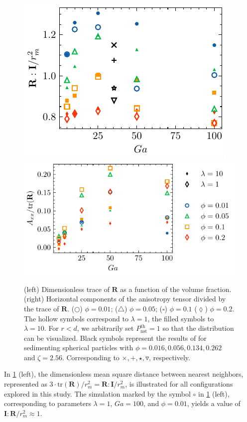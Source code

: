 \begin{figure}[h!]
    \centering
    \includegraphics[height=0.3\textwidth]{image/HOMOGENEOUS_NEW/PA/trR.pdf}
    \includegraphics[height=0.3\textwidth]{image/HOMOGENEOUS_NEW/PA/Axx.pdf}
    \caption{
        (left) Dimensionless trace of $\textbf{R}$ as a function of the volume fraction.%
        (right) Horizontal components of the anisotropy tensor divided by the trace of $\textbf{R}$. %
    ($\pmb\bigcirc$) $\phi = 0.01$; ($\pmb\triangle$) $ \phi = 0.05$; ($\pmb\square$) $\phi = 0.1$ ($\pmb\lozenge$) $\phi = 0.2$.
    The hollow symbols correspond to $\lambda = 1$, the filled symbols to $\lambda = 10$.
    For $r<d$, we arbitrarily set $P_\text{nst}^\text{th} = 1$ so that the distribution can be visualized.
    Black symbols represent the results of \citet{zhang2023evolution} for sedimenting spherical particles with $\phi = 0.016,0.056,0.134,0.262$ and $\zeta = 2.56$. %
    Corresponding to $\pmb\times,\pmb +, \pmb\star , \pmb\triangledown$, respectively.
    }
    \label{fig:A}
\end{figure}
In \ref{fig:A} (left), the dimensionless mean square distance between nearest neighbors, represented as $3\cdot\text{tr}(\textbf{R})/r_m^2 = \textbf{R}:\textbf{I}/r_m^2$, is illustrated for all configurations explored in this study. 
The simulation marked by the symbol \textcolor{col1}{$\pmb\circ$} in \ref{fig:A} (left), corresponding to parameters $\lambda = 1$, $Ga = 100$, and $\phi = 0.01$, yields a value of $\textbf{I}:\textbf{R}/r_m^2 \approx 1$. 
